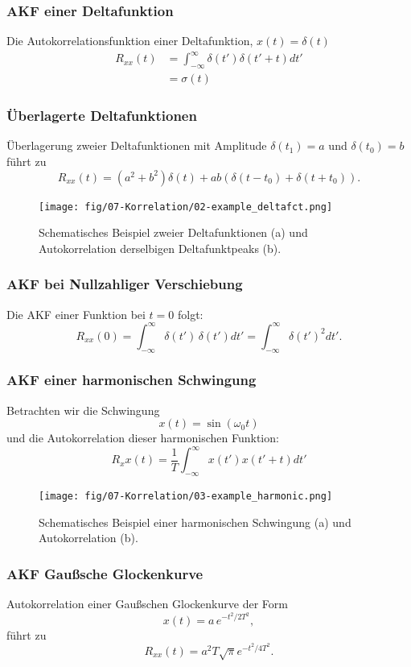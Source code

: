 \subsubsection*{AKF einer Deltafunktion}
Die Autokorrelationsfunktion einer Deltafunktion, $x(t) = \delta(t)$
\begin{align*}
R_{xx}(t) & = \int_{-\infty}^\infty \delta(t') \delta(t'+t) dt'\\
& = \sigma(t)
\end{align*}

\subsubsection*{Überlagerte Deltafunktionen}
Überlagerung zweier Deltafunktionen mit Amplitude $\delta(t_1) = a$ und $\delta(t_0) = b$ führt zu
\[
R_{xx}(t) = (a^2 + b^2)\delta(t) + ab(\delta(t-t_0) + \delta(t+t_0)).
\]

\begin{figure}[h!]
\centering
\texttt{[image: fig/07-Korrelation/02-example\_deltafct.png]}
\caption{Schematisches Beispiel zweier Deltafunktionen (a) und Autokorrelation derselbigen Deltafunktpeaks (b).}
\end{figure}

\subsubsection*{AKF bei Nullzahliger Verschiebung}
Die AKF einer Funktion bei $t=0$ folgt:
\[
R_{xx}(0) = \int_{-\infty}^\infty \delta(t')\,\delta(t') dt' = \int_{-\infty}^\infty \delta(t')^2 dt'.
\]


\subsubsection*{AKF einer harmonischen Schwingung}
Betrachten wir die Schwingung
\[
x(t) = \sin(\omega_0 t)
\]
und die Autokorrelation dieser harmonischen Funktion:
\[
R_xx(t) = \frac{1}{T} \int_{-\infty}^\infty x(t') x(t'+t) dt'
\]
\begin{figure}[h!]
\centering
\texttt{[image: fig/07-Korrelation/03-example\_harmonic.png]}
\caption{Schematisches Beispiel einer harmonischen Schwingung (a) und Autokorrelation (b).}
\end{figure}

\subsubsection*{AKF Gaußsche Glockenkurve}
Autokorrelation einer Gaußschen Glockenkurve der Form
\[
x(t) = a\,e^{-t^2/2T^2},
\]
führt zu
\[
R_{xx}(t) = a^2 T \sqrt{\pi} e^{-t^2/4T^2}.
\]

